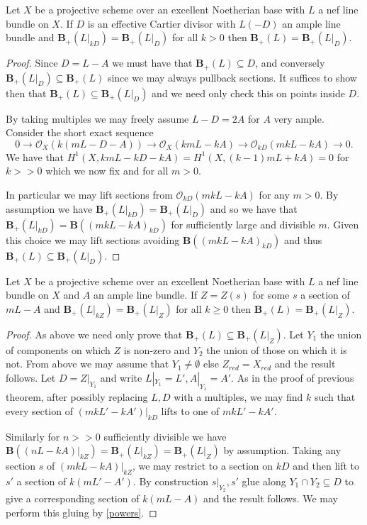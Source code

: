 \documentclass[a4paper,12pt]{book}
\newcommand{\BB}{\mathbf{B}}
\newcommand{\BS}{\mathbf{B}_{+}}
\newcommand{\ox}[1][X]{\mathcal{O}_{#1}}
\begin{document}
\begin{lemma}
	Let $X$ be a projective scheme over an excellent Noetherian base with $L$ a nef line bundle on $X$. If $D$ is an effective Cartier divisor with $L(-D)$ an ample line bundle and $\BS(L|_{kD})=\BS(L|_{D})$ for all $k > 0$ then $\BS(L)=\BS(L|_{D})$.
\end{lemma}

\begin{proof}
	Since $D=L-A$ we must have that $\BS(L) \subseteq D$, and conversely $\BS(L|_{D}) \subseteq \BS(L)$ since we may always pullback sections. It suffices to show then that $\BS(L) \subseteq \BS(L|_{D})$ and we need only check this on points inside $D$.
	
	By taking multiples we may freely assume $L-D=2A$ for $A$ very ample. Consider the short exact sequence
	\[0 \to \ox(k(mL-D-A))\to \ox(kmL-kA) \to \ox[kD](mkL-kA) \to 0.\]
	We have that $H^{1}(X,kmL-kD-kA)=H^{1}(X,(k-1)mL+kA)=0$ for $k >>0$ which we now fix and for all $m >0$.
	
	In particular we may lift sections from $\ox[kD](mkL-kA)$ for any $m>0$. By assumption we have $\BS(L|_{kD})=\BS(L|_{D})$ and so we have that $\BS(L|_{kD})=\BB((mkL-kA)_{kD})$ for sufficiently large and divisible $m$. Given this choice we may lift sections avoiding $\BB((mkL-kA)_{kD})$ and thus $\BS(L) \subseteq \BS(L|_{D})$.
\end{proof}

\begin{lemma}\label{reduce}
	Let $X$ be a projective scheme over an excellent Noetherian base with $L$ a nef line bundle on $X$ and $A$ an ample line bundle. If $Z=Z(s)$ for some $s$ a section of $mL-A$ and $\BS(L|_{kZ})=\BS(L|_{Z})$ for all $k \geq 0$ then $\BS(L)=\BS(L|_{Z})$.
\end{lemma}

\begin{proof}
	As above we need only prove that $\BS(L)\subseteq \BS(L|_{Z})$.	Let $Y_{1}$ the union of components on which $Z$ is non-zero and $Y_{2}$ the union of those on which it is not. From above we may assume that $Y_{1} \neq \emptyset$ else $Z_{red}=X_{red}$ and the result follows. Let $D=Z|_{Y_{1}}$ and write $L|_{Y_{1}}=L', A|_{Y_{1}}=A'$. As in the proof of previous theorem, after possibly replacing $L,D$ with a multiples, we may find $k$ such that every section of $(mkL'-kA')|_{kD}$ lifts to one of $mkL'-kA'$. 
	
	Similarly for $n>>0$ sufficiently divisible we have $\mathbf{B}((nL-kA)|_{kZ})=\BS(L|_{kZ})=\BS(L|_{Z})$ by assumption. Taking any section $s$ of $(mkL-kA)|_{kZ}$, we may restrict to a section on $kD$ and then lift to $s'$ a section of $k(mL'-A')$. By construction $s|_{Y_{2}},s'$ glue along $Y_{1}\cap Y_{2}\subseteq D$ to give a corresponding section of $k(mL-A)$ and the result follows. We may perform this gluing by \autoref{powers}.
\end{proof}
\end{document}
